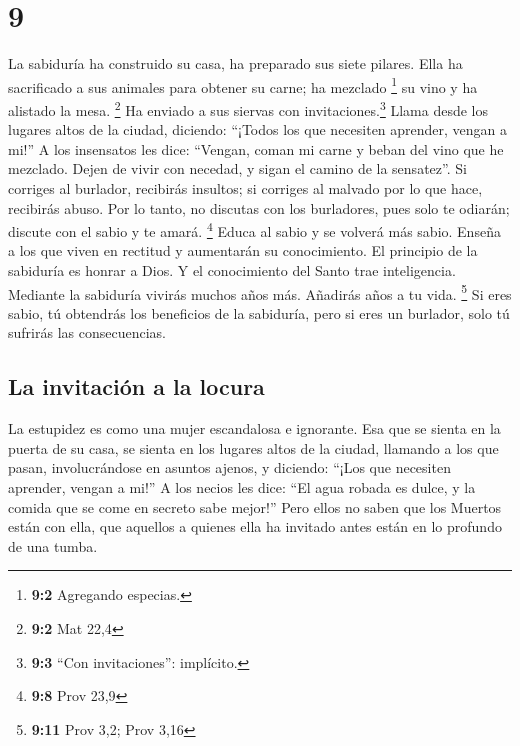 \hypertarget{section-8}{%
\section{9}\label{section-8}}

 La sabiduría ha construido su casa, ha preparado sus
siete pilares.  Ella ha sacrificado a sus animales para
obtener su carne; ha mezclado \footnote{\textbf{9:2} Agregando especias.}
su vino y ha alistado la mesa. \footnote{\textbf{9:2} Mat 22,4}
 Ha enviado a sus siervas con invitaciones.\footnote{\textbf{9:3}
  ``Con invitaciones'': implícito.} Llama desde los lugares altos de la
ciudad, diciendo:  ``¡Todos los que necesiten aprender,
vengan a mi!'' A los insensatos les dice:  ``Vengan, coman
mi carne y beban del vino que he mezclado.  Dejen de vivir
con necedad, y sigan el camino de la sensatez''.  Si
corriges al burlador, recibirás insultos; si corriges al malvado por lo
que hace, recibirás abuso.  Por lo tanto, no discutas con
los burladores, pues solo te odiarán; discute con el sabio y te amará.
\footnote{\textbf{9:8} Prov 23,9}  Educa al sabio y se
volverá más sabio. Enseña a los que viven en rectitud y aumentarán su
conocimiento.  El principio de la sabiduría es honrar a
Dios. Y el conocimiento del Santo trae inteligencia. 
Mediante la sabiduría vivirás muchos años más. Añadirás años a tu vida.
\footnote{\textbf{9:11} Prov 3,2; Prov 3,16}  Si eres
sabio, tú obtendrás los beneficios de la sabiduría, pero si eres un
burlador, solo tú sufrirás las consecuencias.

\hypertarget{la-invitaciuxf3n-a-la-locura}{%
\subsection{La invitación a la
locura}\label{la-invitaciuxf3n-a-la-locura}}

 La estupidez es como una mujer escandalosa e ignorante.
 Esa que se sienta en la puerta de su casa, se sienta en
los lugares altos de la ciudad,  llamando a los que
pasan, involucrándose en asuntos ajenos, y diciendo: 
``¡Los que necesiten aprender, vengan a mi!'' A los necios les dice:
 ``El agua robada es dulce, y la comida que se come en
secreto sabe mejor!''  Pero ellos no saben que los
Muertos están con ella, que aquellos a quienes ella ha invitado antes
están en lo profundo de una tumba.

